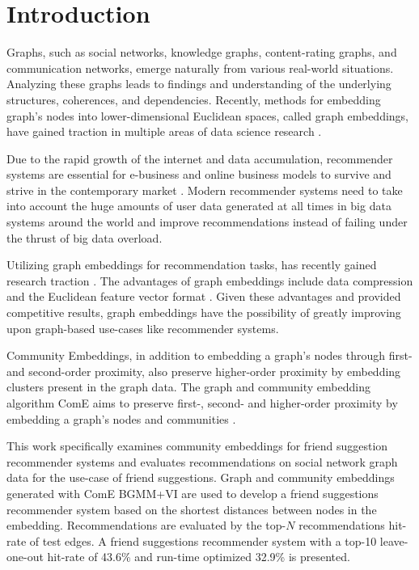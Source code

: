\documentclass[conference]{IEEEtran}
\begin{document}
\section{Introduction}

Graphs, such as social networks, knowledge graphs, content-rating graphs, and communication networks, emerge naturally from various real-world situations. Analyzing these graphs leads to findings and understanding of the underlying structures, coherences, and dependencies. Recently, methods for embedding graph's nodes into lower-dimensional Euclidean spaces, called graph embeddings, have gained traction in multiple areas of data science research \cite{Goyal_2018}.

Due to the rapid growth of the internet and data accumulation, recommender systems are essential for e-business and online business models to survive and strive in the contemporary market \cite{Polatidis2013RecommenderST}. Modern recommender systems need to take into account the huge amounts of user data generated at all times in big data systems around the world and improve recommendations instead of failing under the thrust of big data overload.

Utilizing graph embeddings for recommendation tasks, has recently gained research traction \cite{Palumbo2018AnEC, Palumbo2018KnowledgeGE, GradGyenge2017GraphEB, Sathish2019GraphEB}. The advantages of graph embeddings include data compression and the Euclidean feature vector format \cite{Godec2018}. Given these advantages and provided competitive results, graph embeddings have the possibility of greatly improving upon graph-based use-cases like recommender systems.

Community Embeddings, in addition to embedding a graph's nodes through first- and second-order proximity, also preserve higher-order proximity by embedding clusters present in the graph data. The graph and community embedding algorithm ComE aims to preserve first-, second- and higher-order proximity by embedding a graph's nodes and communities \cite{ComE}.

This work specifically examines community embeddings for friend suggestion recommender systems and evaluates recommendations on social network graph data for the use-case of friend suggestions. Graph and community embeddings generated with ComE BGMM+VI are used to develop a friend suggestions recommender system based on the shortest distances between nodes in the embedding. Recommendations are evaluated by the top-$N$ recommendations hit-rate of test edges. A friend suggestions recommender system with a top-10 leave-one-out hit-rate of 43.6\% and run-time optimized 32.9\% is presented.
\end{document}
